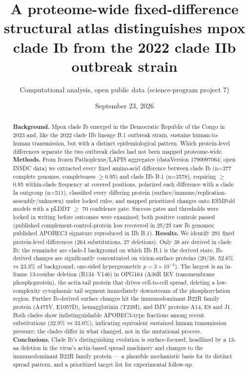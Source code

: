 \documentclass[11pt]{article}
\title{A proteome-wide fixed-difference structural atlas distinguishes mpox clade Ib from the 2022 clade IIb outbreak strain}
\author{Computational analysis, open public data (science-program project 7)}
\date{September 23, 2026}
\begin{document}
\maketitle
\begin{abstract}
\textbf{Background.} Mpox clade Ib emerged in the Democratic Republic of the Congo in 2023 and,
like the 2022 clade IIb lineage B.1 outbreak strain, sustains human-to-human transmission, but with
a distinct epidemiological pattern. Which protein-level differences separate the two outbreak clades
had not been mapped proteome-wide. \textbf{Methods.} From frozen Pathoplexus/LAPIS aggregates
(dataVersion 1790097064; open INSDC data) we extracted every fixed amino-acid difference between
clade Ib (n=377 complete genomes, completeness $\geq$0.95) and clade IIb B.1 (n=3578), requiring
$\geq$0.95 within-clade frequency at covered positions, polarized each difference with a clade Ia
outgroup (n=511), classified every differing protein (surface/immune/replication-assembly/unknown)
under locked rules, and mapped prioritized changes onto ESMFold models with a pLDDT $\geq$ 70
confidence gate. Success gates and thresholds were locked in writing before outcomes were examined;
both positive controls passed (published complement-control-protein loss recovered in 25/25 raw Ib
genomes; published APOBEC3 signature reproduced in IIb B.1). \textbf{Results.} We identify 291
fixed protein-level differences (264 substitutions, 27 deletions). Only 38 are derived in clade Ib;
the remainder are clade-I background on which IIb B.1 is the derived state. Ib-derived changes are
significantly concentrated on virion-surface proteins (20/38, 52.6\% vs 23.3\% of background;
one-sided hypergeometric $p=3\times10^{-4}$). The largest is an in-frame 13-residue deletion
(R134--V146) in OPG164 (A36R IEV transmembrane phosphoprotein), the actin-tail protein that drives
cell-to-cell spread, deleting a low-complexity cytoplasmic tail segment immediately downstream of
the phosphorylation region. Further Ib-derived surface changes hit the immunodominant B22R family
protein (A475V, E1057D), hemagglutinin (T239I), and IMV proteins A14, E8 and J1. Both clades show
indistinguishable APOBEC3-type fractions among recent substitutions (32.9\% vs 33.0\%), indicating
equivalent sustained human transmission pressure; the clades differ in what changed, not in the
mutational process. \textbf{Conclusions.} Clade Ib's distinguishing evolution is surface-focused,
headlined by a 13-aa deletion in the virus's actin-based spread machinery and changes to the
immunodominant B22R family protein --- a plausible mechanistic basis for its distinct spread
pattern, and a prioritized target list for experimental follow-up.
\end{abstract}
\end{document}
